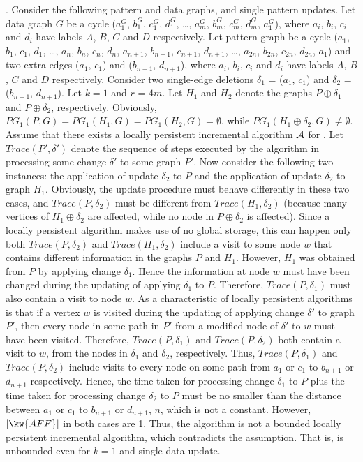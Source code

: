 .
Consider the following pattern and data graphs, and single pattern updates. Let data graph $G$ be a cycle ($a_1^G$, $b_1^G$, $c_1^G$, $d_1^G$, \ldots, $a_m^G$, $b_m^G$, $c_m^G$, $d_m^G$, $a_1^G$), where $a_i$, $b_i$, $c_i$ and $d_i$ have labels $A$, $B$, $C$ and $D$ respectively. Let pattern graph be a cycle ($a_1$, $b_1$, $c_1$, $d_1$, \ldots, $a_n$, $b_n$, $c_n$, $d_n$, $a_{n+1}$, $b_{n+1}$, $c_{n+1}$, $d_{n+1}$, \ldots, $a_{2n}$, $b_{2n}$, $c_{2n}$, $d_{2n}$, $a_1$) and two extra edges ($a_1$, $c_1$) and ($b_{n+1}$, $d_{n+1}$), where $a_i$, $b_i$, $c_i$ and $d_i$ have labels $A$, $B$, $C$ and $D$ respectively. Consider two single-edge deletions $\delta_1$ = ($a_1$, $c_1$) and $\delta_2$ = ($b_{n+1}$, $d_{n+1}$). Let $k = 1$ and $r$ = $4m$. Let $H_1$ and $H_2$ denote the graphs $P\oplus \delta_1$ and $P\oplus \delta_2$, respectively. Obviously, $PG_1(P, G) = PG_1(H_1, G) = PG_1(H_2, G) = \emptyset$, while $PG_1(H_1\oplus \delta_2, G) \neq \emptyset$. Assume that there exists a locally persistent incremental algorithm ${\cal A}$ for \dyngr. Let $Trace(P', \delta')$ denote the sequence of steps executed by the algorithm in processing some change $\delta'$ to some graph $P'$. Now consider the following two instances: the application of update $\delta_2$ to $P$ and the application of update $\delta_2$ to graph $H_1$. Obviously, the update procedure must behave differently in these two cases, and $Trace(P, \delta_2)$ must be different from $Trace(H_1, \delta_2)$ (because many vertices of $H_1\oplus \delta_2$ are affected, while no node in $P\oplus \delta_2$ is affected). Since a locally persistent algorithm makes use of no global storage, this can happen only both $Trace(P, \delta_2)$ and $Trace(H_1, \delta_2)$ include a visit to some node $w$ that contains different information in the graphs $P$ and $H_1$. However, $H_1$ was obtained from $P$ by applying change $\delta_1$. Hence the information at node $w$ must have been changed during the updating of applying $\delta_1$ to $P$. Therefore, $Trace(P, \delta_1)$ must also contain a visit to node $w$. As a characteristic of locally persistent algorithms is that if a vertex $w$ is visited during the updating of applying change $\delta'$ to graph $P'$, then every node in some path in $P'$ from a modified node of $\delta'$ to $w$ must have been visited.
Therefore, $Trace(P, \delta_1)$ and $Trace(P, \delta_2)$ both contain a visit to $w$, from the nodes in $\delta_1$ and $\delta_2$, respectively. Thus, $Trace(P, \delta_1)$ and $Trace(P, \delta_2)$ include visits to every node on some path from $a_1$ or $c_1$ to $b_{n+1}$ or $d_{n+1}$ respectively. Hence, the time taken for processing change $\delta_1$ to $P$ plus the time taken for processing change $\delta_2$ to $P$ must be no smaller than the distance between $a_1$ or $c_1$ to $b_{n+1}$ or $d_{n+1}$, \ie $n$, which is not a constant.
However, $|\kw{AFF}|$ in both cases are 1. Thus, the algorithm is not a bounded locally persistent incremental algorithm, which contradicts the assumption. That is, \dyngr is unbounded even for $k=1$ and single data update.

